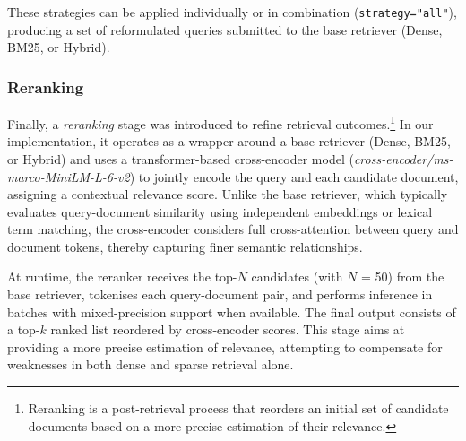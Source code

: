 \begin{spacing}{1.5}
These strategies can be applied individually or in combination (\texttt{strategy="all"}), producing a set of reformulated queries submitted to the base retriever (Dense, BM25, or Hybrid).\\


\noindent\subsubsection*{\Large Reranking}

Finally, a \textit{reranking} stage was introduced to refine retrieval outcomes.\footnote{Reranking is a post-retrieval process that reorders an initial set of candidate documents based on a more precise estimation of their relevance.} In our implementation, it operates as a wrapper around a base retriever (Dense, BM25, or Hybrid) and uses a transformer-based cross-encoder model (\textit{cross-encoder/ms-marco-MiniLM-L-6-v2}) to jointly encode the query and each candidate document, assigning a contextual relevance score. Unlike the base retriever, which typically evaluates query-document similarity using independent embeddings or lexical term matching, the cross-encoder considers full cross-attention between query and document tokens, thereby capturing finer semantic relationships.

At runtime, the reranker receives the top-$N$ candidates (with $N$ = 50) from the base retriever, tokenises each query-document pair, and performs inference in batches with mixed-precision support when available. The final output consists of a top-$k$ ranked list reordered by cross-encoder scores. This stage aims at providing a more precise estimation of relevance, attempting to compensate for weaknesses in both dense and sparse retrieval alone.



\end{spacing}
